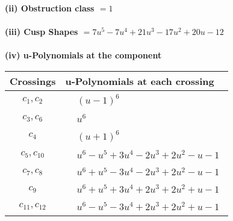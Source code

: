 \documentclass[1p]{elsarticle_modified}
\theoremstyle{definition}
\begin{document}
\flushleft \textbf{(ii) Obstruction class $= 1$}\\~\\
\flushleft \textbf{(iii) Cusp Shapes $= 7 u^5-7 u^4+21 u^3-17 u^2+20 u-12$}\\~\\
\newpage\renewcommand{\arraystretch}{1}
\flushleft \textbf{(iv) u-Polynomials at the component}\newline \\
\begin{tabular}{m{50pt}|m{274pt}}
Crossings & \hspace{64pt}u-Polynomials at each crossing \\
\hline $$\begin{aligned}c_{1},c_{2}\end{aligned}$$&$\begin{aligned}
&(u-1)^6
\end{aligned}$\\
\hline $$\begin{aligned}c_{3},c_{6}\end{aligned}$$&$\begin{aligned}
&u^6
\end{aligned}$\\
\hline $$\begin{aligned}c_{4}\end{aligned}$$&$\begin{aligned}
&(u+1)^6
\end{aligned}$\\
\hline $$\begin{aligned}c_{5},c_{10}\end{aligned}$$&$\begin{aligned}
&u^6- u^5+3 u^4-2 u^3+2 u^2- u-1
\end{aligned}$\\
\hline $$\begin{aligned}c_{7},c_{8}\end{aligned}$$&$\begin{aligned}
&u^6+u^5-3 u^4-2 u^3+2 u^2- u-1
\end{aligned}$\\
\hline $$\begin{aligned}c_{9}\end{aligned}$$&$\begin{aligned}
&u^6+u^5+3 u^4+2 u^3+2 u^2+u-1
\end{aligned}$\\
\hline $$\begin{aligned}c_{11},c_{12}\end{aligned}$$&$\begin{aligned}
&u^6- u^5-3 u^4+2 u^3+2 u^2+u-1
\end{aligned}$\\
\hline
\end{tabular}\\~\\
\end{document}
